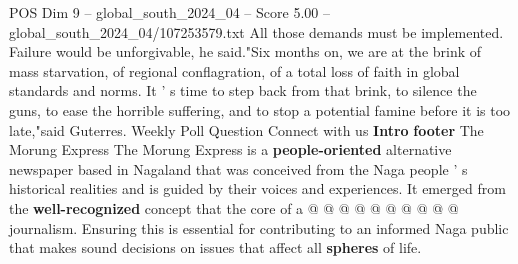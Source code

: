 \begin{textsample}{POS Dim 9 – global\_south\_2024\_04 – Score 5.00 – global\_south\_2024\_04/107253579.txt}
All those demands must be implemented.
Failure would be unforgivable, he said."Six months on, we are at the brink of mass starvation, of regional conflagration, of a total loss of faith in global standards and norms.
It ' s time to step back from that brink, to silence the guns, to ease the horrible suffering, and to stop a potential famine before it is too late,"said Guterres.
Weekly Poll Question Connect with us \textbf{Intro} \textbf{footer} The Morung Express The Morung Express is a \textbf{people-oriented} alternative newspaper based in Nagaland that was conceived from the Naga people ' s historical realities and is guided by their voices and experiences.
It emerged from the \textbf{well-recognized} concept that the core of a @ @ @ @ @ @ @ @ @ @ journalism.
Ensuring this is essential for contributing to an informed Naga public that makes sound decisions on issues that affect all \textbf{spheres} of life.

\end{textsample}
